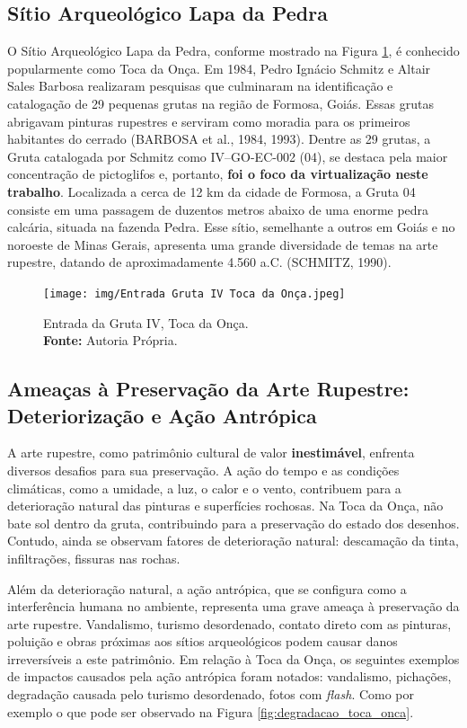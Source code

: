 \subsection {Sítio Arqueológico Lapa da Pedra}
O Sítio Arqueológico Lapa da Pedra, conforme mostrado na Figura \ref{fig:Entrada da Gruta IV,Toca da Onça}, é conhecido popularmente como Toca da Onça. Em 1984, Pedro Ignácio Schmitz e Altair Sales Barbosa realizaram pesquisas que culminaram na identificação e catalogação de 29 pequenas grutas na região de Formosa, Goiás. Essas grutas abrigavam pinturas rupestres e serviram como moradia para os primeiros habitantes do cerrado (BARBOSA et al., 1984, 1993).
Dentre as 29 grutas, a Gruta catalogada por Schmitz como IV–GO-EC-002 (04), se destaca pela maior concentração de pictoglifos e, portanto, \textbf{foi o foco da virtualização neste trabalho}. Localizada a cerca de 12 km da cidade de Formosa, a Gruta 04 consiste em uma passagem de duzentos metros abaixo de uma enorme pedra calcária, situada na fazenda Pedra. Esse sítio, semelhante a outros em Goiás e no noroeste de Minas Gerais, apresenta uma grande diversidade de temas na arte rupestre, datando de aproximadamente 4.560 a.C. (SCHMITZ, 1990).


\begin{figure}[H]
    \centering
    \texttt{[image: img/Entrada Gruta IV Toca da Onça.jpeg]}
    \caption{Entrada da Gruta IV, Toca da Onça. \\
        \textbf{Fonte:} Autoria Própria.}
    \label{fig:Entrada da Gruta IV,Toca da Onça}
\end{figure}



\subsection{Ameaças à Preservação da Arte Rupestre: Deteriorização e Ação Antrópica}
A arte rupestre, como patrimônio cultural de valor \textbf{inestimável}, enfrenta diversos desafios para sua preservação. A ação do tempo e as condições climáticas, como a umidade, a luz, o calor e o vento, contribuem para a deterioração natural das pinturas e superfícies rochosas.
Na Toca da Onça,  não bate sol dentro da gruta, contribuindo para a preservação do estado dos desenhos. Contudo, ainda se observam fatores de deterioração natural: descamação da tinta, infiltrações, fissuras nas rochas.


Além da deterioração natural, a ação antrópica, que se configura como a interferência humana no ambiente, representa uma grave ameaça à preservação da arte rupestre. Vandalismo, turismo desordenado, contato direto com as pinturas, poluição e obras próximas aos sítios arqueológicos podem causar danos irreversíveis a este patrimônio.
Em relação à Toca da Onça, os seguintes exemplos de impactos causados pela ação antrópica foram notados: vandalismo, pichações, degradação causada pelo turismo desordenado, fotos com \textit{flash}. Como por exemplo o que pode ser observado na Figura \ref{fig:degradacao_toca_onca}.

